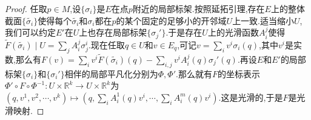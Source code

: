 \begin{enumerate}
\begin{proof}
		任取$p\in M$,设$\{\sigma_i\}$是$E$在点$p$附近的局部标架.按照延拓引理,存在$E$上的整体截面$\{\widetilde{\sigma_i}\}$使得每个$\widetilde{\sigma_i}$和$\sigma_i$都在$p$的某个固定的足够小的开邻域$U$上一致.适当缩小$U$,我们可以约定$E'$在$U$上也存在局部标架$\{\sigma_j'\}$.于是存在$U$上的光滑函数$A_i^j$使得$\widetilde{F}(\widetilde{\sigma_i})\mid U=\sum_jA_i^j\sigma_j^i$.现在任取$q\in U$和$v\in E_q$,可记$v=\sum_iv^i\sigma_i(q)$,其中$v^i$是实数,那么有$F(v)=\sum_iv^i\widetilde{F}(\widetilde{\sigma_i})(q)-\sum_{i,j}v^iA_i^j(q)\sigma_j'(q)$.再设$E$和$E'$的局部标架$\{\sigma_i\}$和$\{\sigma_i'\}$相伴的局部平凡化分别为$\Phi,\Phi'$.那么就有$F$的坐标表示$\Phi'\circ F\circ\Phi^{-1}:U\times\mathbb{R}^k\to U\times\mathbb{R}^k$为$(q,v^1,v^2,\cdots,v^k)\mapsto(q,\sum_iA_i^1(q)v^i,\cdots,\sum_iA_i^m(q)v^i)$.这是光滑的,于是$F$是光滑映射.
	\end{proof}
\end{enumerate}

